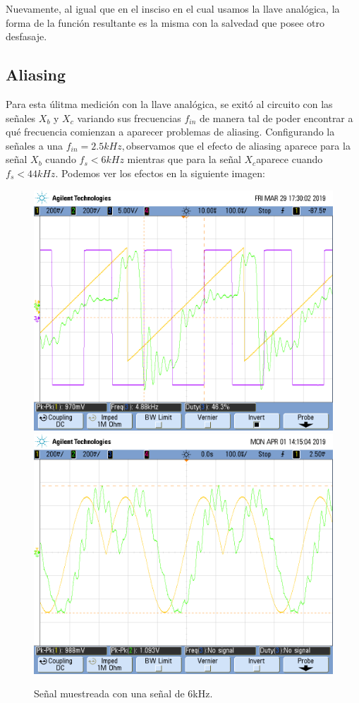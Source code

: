 \documentclass[../../ASSD_TP1_G7.tex]{subfiles}
\begin{document}
Nuevamente, al igual que en el insciso en el cual usamos la llave
analógica, la forma de la función resultante es la misma con la salvedad
que posee otro desfasaje.

\subsection{Aliasing}

Para esta úlitma medición con la llave analógica, se exitó al circuito
con las señales $X_{b}$ y $X_{c}$ variando sus frecuencias $f_{in}$
de manera tal de poder encontrar a qué frecuencia comienzan a aparecer
problemas de aliasing. Configurando la señales a una $f_{in}=2.5kHz,$observamos
que el efecto de aliasing aparece para la señal $X_{b}$ cuando $f_{s}<6kHz$
mientras que para la señal $X_{c}$aparece cuando $f_{s}<44kHz$.
Podemos ver los efectos en la siguiente imagen:

\begin{figure}[H]
\begin{centering}
\includegraphics[scale=0.25]{Imagenes/yh_pt6d_cuad2}\includegraphics[scale=0.25]{Imagenes/ej_6_d_syh}
\par\end{centering}
\caption{Señal muestreada con una señal de 6kHz.}
\end{figure}
\end{document}
